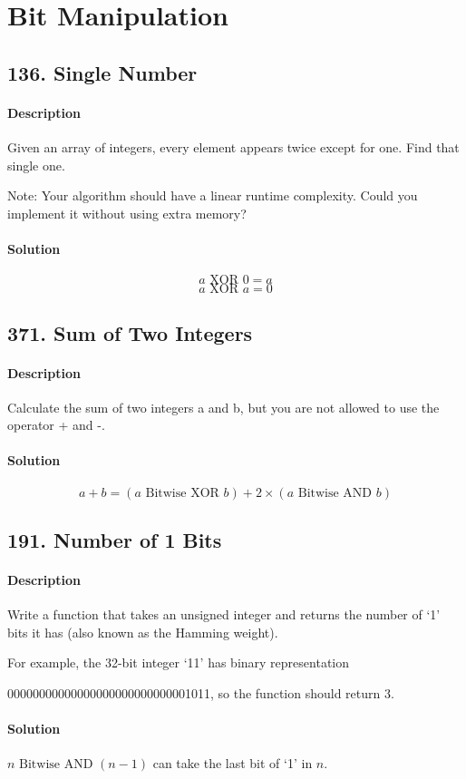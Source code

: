 \section{Bit Manipulation}

\subsection{136. Single Number}

\paragraph{\color{white} \colorbox{Mahogany}{Description}}
Given an array of integers, every element appears twice except for one. Find that single one.

Note:
Your algorithm should have a linear runtime complexity. Could you implement it without using extra memory?

\paragraph{\color{white} \colorbox{OliveGreen}{Solution}}
$$a\text{ XOR }0 = a$$
$$a\text{ XOR }a = 0$$

\subsection{371. Sum of Two Integers}

\paragraph{\color{white} \colorbox{Mahogany}{Description}}
Calculate the sum of two integers a and b, but you are not allowed to use the operator + and -.

\paragraph{\color{white} \colorbox{OliveGreen}{Solution}}
$$a+b=(a\text{ Bitwise XOR }b) + 2\times(a\text{ Bitwise AND }b)$$

\subsection{191. Number of 1 Bits}

\paragraph{\color{white} \colorbox{Mahogany}{Description}}
Write a function that takes an unsigned integer and returns the number of `1' bits it has (also known as the Hamming weight).

For example, the 32-bit integer `11' has binary representation

00000000000000000000000000001011, so the function should return 3.

\paragraph{\color{white} \colorbox{OliveGreen}{Solution}}
$n\text{ Bitwise AND }(n-1)$ can take the last bit of `1' in $n$.